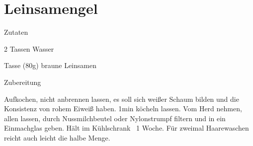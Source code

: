 \chapter*{Leinsamengel}
\begin{multicols}{2}
 {\Large Zutaten}
 \begin{Zutaten}
		\item 2 Tassen Wasser
		\item {} Tasse (80g) braune Leinsamen
		
\end{Zutaten}
\columnbreak
\end{multicols}

{\Large Zubereitung} \newline
\begin{addmargin}[1cm]{0cm}
	Aufkochen, nicht anbrennen lassen, es soll sich weißer Schaum bilden und die Konsistenz von rohem
	Eiweiß haben.\newline
	1min köcheln lassen.\newline
	Vom Herd nehmen, allen lassen, durch Nussmilchbeutel oder Nylonstrumpf filtern und in ein Einmachglas geben.\newline
	Hält im Kühlschrank ~1 Woche.\newline\newline
	Für zweimal Haarewaschen reicht auch leicht die halbe Menge.
	
\end{addmargin}
